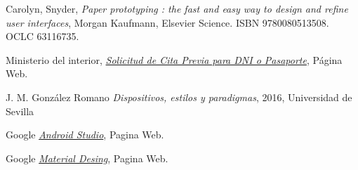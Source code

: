 \documentclass[a4paper,11pt]{article}
\begin{document}
\begin{thebibliography}{99}
Carolyn, Snyder,
\textit{Paper prototyping : the fast and easy way to design and refine user interfaces},
 Morgan Kaufmann, Elsevier Science. ISBN 9780080513508. OCLC 63116735.


Ministerio del interior,
\href{https://www.citapreviadnie.es/citaPreviaDniExp/}{\textit{Solicitud de Cita Previa para DNI o Pasaporte}}, Página Web.


J. M. González Romano
\textit{Dispositivos, estilos y paradigmas}, 2016, Universidad de Sevilla

Google
\href{https://developer.android.com/studio/}{\textit{Android Studio}}, Pagina Web.

Google
\href{https://material.io/}{\textit{Material Desing}}, Pagina Web.



\end{thebibliography}
\end{document}
